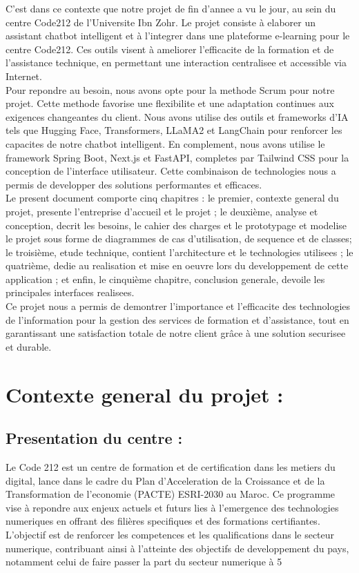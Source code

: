 \documentclass[a4paper, 11pt, openany]{report}
\begin{document}
C’est dans ce contexte que notre projet de fin d’annee a vu le jour, au sein du centre Code212 de l’Universite Ibn Zohr. Le projet consiste à elaborer un assistant chatbot intelligent et à l'integrer dans une plateforme e-learning pour le centre Code212. Ces outils visent à ameliorer l’efficacite de la formation et de l'assistance technique, en permettant une interaction centralisee et accessible via Internet.
\\

Pour repondre au besoin, nous avons opte pour la methode Scrum pour notre projet. Cette methode favorise une flexibilite et une adaptation continues aux exigences changeantes du client. Nous avons utilise des outils et frameworks d'IA tels que Hugging Face, Transformers, LLaMA2 et LangChain pour renforcer les capacites de notre chatbot intelligent. En complement, nous avons utilise le framework Spring Boot, Next.js et FastAPI, completes par Tailwind CSS pour la conception de l’interface utilisateur. Cette combinaison de technologies nous a permis de developper des solutions performantes et efficaces. 
\\

Le present document comporte cinq chapitres : le premier, contexte general du projet, presente l’entreprise d’accueil et le projet ; le deuxième, analyse et conception, decrit les besoins, le cahier des charges et le prototypage et modelise le projet sous forme de diagrammes de cas d’utilisation, de sequence et de classes; le troisième, etude technique, contient l'architecture et le technologies utilisees ; le quatrième, dedie au realisation et mise en oeuvre lors du developpement de cette application ; et enfin, le cinquième chapitre, conclusion generale, devoile les principales interfaces realisees.
\\

Ce projet nous a permis de demontrer l'importance et l’efficacite des technologies de l'information pour la gestion des services de formation et d’assistance, tout en garantissant une satisfaction totale de notre client grâce à une solution securisee et durable.







\chapter{Contexte general du projet :}
\section{Presentation du centre :}
Le Code 212 est un centre de formation et de certification dans les metiers du digital, lance dans le cadre du Plan d'Acceleration de la Croissance et de la Transformation de l'economie (PACTE) ESRI-2030 au Maroc. Ce programme vise à repondre aux enjeux actuels et futurs lies à l'emergence des technologies numeriques en offrant des filières specifiques et des formations certifiantes. L'objectif est de renforcer les competences et les qualifications dans le secteur numerique, contribuant ainsi à l'atteinte des objectifs de developpement du pays, notamment celui de faire passer la part du secteur numerique à 5%
\end{document}
